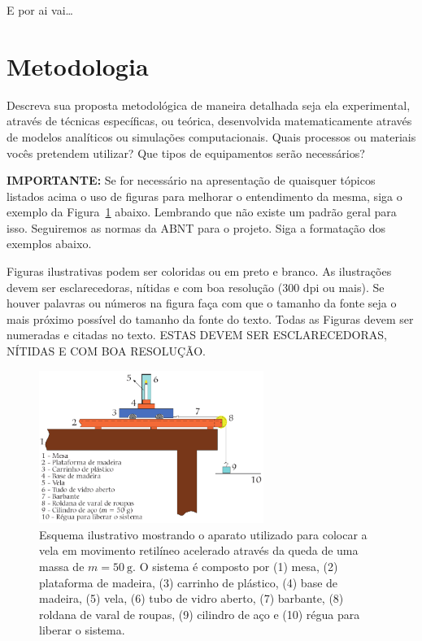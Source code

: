 \documentclass[12pt,oneside,brazil,hidelinks,article,sumario=tradicional,a4paper]{abntex2}
\begin{document}
E por ai vai\ldots

\section{Metodologia}

Descreva sua proposta metodológica de maneira detalhada seja ela experimental, através de técnicas específicas, ou teórica, desenvolvida matematicamente através de modelos analíticos ou simulações computacionais. Quais processos ou materiais vocês pretendem utilizar? Que tipos de equipamentos serão necessários?

\noindent
\textbf{\color{red}IMPORTANTE:} Se for necessário na apresentação de quaisquer tópicos listados acima o uso de figuras para melhorar o entendimento da mesma, siga o exemplo da Figura~\ref{fig1} abaixo. Lembrando que não existe um padrão geral para isso. Seguiremos as normas da ABNT para o projeto. Siga a formatação dos exemplos abaixo.

{\color{red}Figuras ilustrativas podem ser coloridas ou em preto e branco. As ilustrações devem ser esclarecedoras, nítidas e com boa resolução (300 dpi ou mais). Se houver palavras ou números na figura faça com que o tamanho da fonte seja o mais próximo possível do tamanho da fonte do texto. Todas as Figuras devem ser numeradas e citadas no texto. ESTAS DEVEM SER ESCLARECEDORAS, NÍTIDAS E COM BOA RESOLUÇÃO.}

\begin{figure}[ht!]
  \centering
  \caption{Esquema ilustrativo mostrando o aparato utilizado para colocar a vela em movimento retilíneo acelerado através da queda de uma massa de \(m = \SI{50}{\gram}\). O sistema é composto por (1) mesa, (2) plataforma de madeira, (3) carrinho de plástico, (4) base de madeira, (5) vela, (6) tubo de vidro aberto, (7) barbante, (8) roldana de varal de roupas, (9) cilindro de aço e (10) régua para liberar o sistema.}\label{fig1}
  \includegraphics[width=0.65\textwidth]{fig1.png}
\end{figure}
\end{document}
